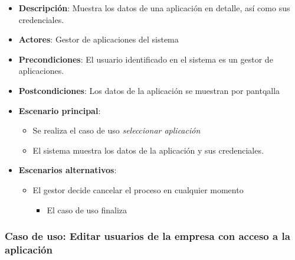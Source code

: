 \documentclass[12pt,a4paperpaper,]{report}
\providecommand{\tightlist}{%
  \setlength{\itemsep}{0pt}\setlength{\parskip}{0pt}}
\begin{document}
\begin{itemize}
\tightlist
\item
  \textbf{Descripción}: Muestra los datos de una aplicación en detalle,
  así como sus credenciales.
\item
  \textbf{Actores}: Gestor de aplicaciones del sistema
\item
  \textbf{Precondiciones}: El usuario identificado en el sistema es un
  gestor de aplicaciones.
\item
  \textbf{Postcondiciones}: Los datos de la aplicación se muestran por
  pantqalla
\item
  \textbf{Escenario principal}:

  \begin{itemize}
  \tightlist
  \item
    Se realiza el caso de uso \emph{seleccionar aplicación}
  \item
    El sistema muestra los datos de la aplicación y sus credenciales.
  \end{itemize}
\item
  \textbf{Escenarios alternativos}:

  \begin{itemize}
  \tightlist
  \item
    El gestor decide cancelar el proceso en cualquier momento

    \begin{itemize}
    \tightlist
    \item
      El caso de uso finaliza
    \end{itemize}
  \end{itemize}
\end{itemize}

\subsubsection{Caso de uso: Editar usuarios de la empresa con acceso a
la
aplicación}\label{caso-de-uso-editar-usuarios-de-la-empresa-con-acceso-a-la-aplicaciuxf3n}
\end{document}
